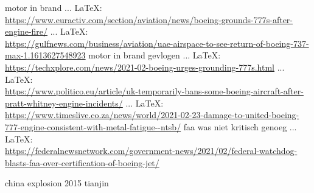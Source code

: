 \begin{thebibliography}{99}
motor in brand
 ... \LaTeX:\\ \url{https://www.euractiv.com/section/aviation/news/boeing-grounds-777s-after-engine-fire/}
 ... \LaTeX:\\ \url{https://gulfnews.com/business/aviation/uae-airspace-to-see-return-of-boeing-737-max-1.1613627548923}
motor in brand gevlogen
 ... \LaTeX:\\ \url{https://techxplore.com/news/2021-02-boeing-urges-grounding-777s.html}
 ... \LaTeX:\\ \url{https://www.politico.eu/article/uk-temporarily-bans-some-boeing-aircraft-after-pratt-whitney-engine-incidents/}
 ... \LaTeX:\\ \url{https://www.timeslive.co.za/news/world/2021-02-23-damage-to-united-boeing-777-engine-consistent-with-metal-fatigue--ntsb/}
faa was niet kritisch genoeg
 ... \LaTeX:\\ \url{https://federalnewsnetwork.com/government-news/2021/02/federal-watchdog-blasts-faa-over-certification-of-boeing-jet/}







china explosion 2015 tianjin


\end{thebibliography}
